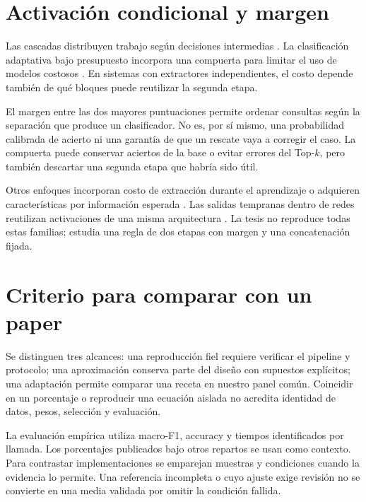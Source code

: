\section{Activación condicional y margen}
Las cascadas distribuyen trabajo según decisiones intermedias \citep{viola2001rapid}. La clasificación adaptativa bajo presupuesto incorpora una compuerta para limitar el uso de modelos costosos \citep{nan2017adaptive}. En sistemas con extractores independientes, el costo depende también de qué bloques puede reutilizar la segunda etapa.

El margen entre las dos mayores puntuaciones permite ordenar consultas según la separación que produce un clasificador. No es, por sí mismo, una probabilidad calibrada de acierto ni una garantía de que un rescate vaya a corregir el caso. La compuerta puede conservar aciertos de la base o evitar errores del Top-\(k\), pero también descartar una segunda etapa que habría sido útil.

Otros enfoques incorporan costo de extracción durante el aprendizaje o adquieren características por información esperada \citep{xu2012greedy,ma2019eddi}. Las salidas tempranas dentro de redes reutilizan activaciones de una misma arquitectura \citep{teerapittayanon2016branchynet,han2021dynamic}. La tesis no reproduce todas estas familias; estudia una regla de dos etapas con margen y una concatenación fijada.

\section{Criterio para comparar con un paper}
Se distinguen tres alcances: una reproducción fiel requiere verificar el pipeline y protocolo; una aproximación conserva parte del diseño con supuestos explícitos; una adaptación permite comparar una receta en nuestro panel común. Coincidir en un porcentaje o reproducir una ecuación aislada no acredita identidad de datos, pesos, selección y evaluación.

La evaluación empírica utiliza macro-F1, accuracy y tiempos identificados por llamada. Los porcentajes publicados bajo otros repartos se usan como contexto. Para contrastar implementaciones se emparejan muestras y condiciones cuando la evidencia lo permite. Una referencia incompleta o cuyo ajuste exige revisión no se convierte en una media validada por omitir la condición fallida.
